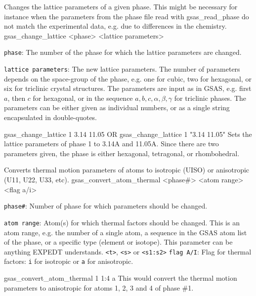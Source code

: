{
Changes the lattice parameters of a given phase. This might be necessary for instance when the parameters from the phase file read with gsas\_read\_phase do not match the experimental data, e.g. due to differences in the chemistry.
}{
gsas\_change\_lattice <phase> <lattice parameters>
}{
\item \texttt{phase}: The number of the phase for which the lattice parameters are changed.
\item \texttt{lattice parameters}: The new lattice parameters. The number of parameters depends on the space-group of the phase, e.g. one for cubic, two for hexagonal, or six for triclinic crystal structures. The parameters are input as in GSAS, e.g. first $a$, then $c$ for hexagonal, or in the sequence $a, b, c, \alpha, \beta, \gamma$ for triclinic phases. The parameters can be either given as individual numbers, or as a single string encapsulated in double-quotes.
}{
gsas\_change\_lattice 1 3.14 11.05 OR
gsas\_change\_lattice 1 "3.14 11.05"
}{
Sets the lattice parameters of phase 1 to 3.14A and 11.05A. Since there are two parameters given, the phase is either hexagonal, tetragonal, or rhombohedral.
}

{
Converts thermal motion parameters of atoms to isotropic (UISO) or anisotropic (U11, U22, U33, etc).
}{
gsas\_convert\_atom\_thermal <phase\#> <atom range> <flag a/i>
}{
\item \texttt{phase\#}: Number of phase for which parameters should be changed.
\item \texttt{atom range}: Atom(s) for which thermal factors should be changed.  This is an atom range, e.g. the number of a single atom, a sequence in the GSAS atom list of the phase, or a specific type (element or isotope). This parameter can be anything EXPEDT understands. \texttt{<t>}, \texttt{<s>} or \texttt{<s1:s2>}
\texttt{flag A/I}:  Flag for thermal factors: \texttt{i} for isotropic or \texttt{a} for anisotropic. \\
}{
gsas\_convert\_atom\_thermal 1 1:4 a
}{
This would convert the thermal motion parameters to anisotropic for atoms 1, 2, 3 and 4 of phase \#1.
}

